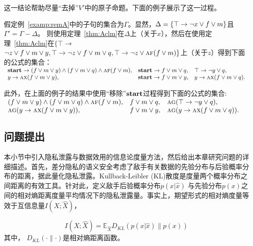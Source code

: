 这一结论帮助尽量“去掉”$V'$中的原子命题。下面的例子展示了这一过程。
\begin{example}
	假定例~\ref{examp:remA}中的子句的集合为$\Gamma$。显然，$\Delta = \{\top \rightarrow \neg x \vee f \vee m\}$且$\Gamma'=\Gamma-\Delta$。
	则使用定理~\ref{thm:Aclm}在$\Delta$上（关于$x$），然后在使用定理~\ref{thm:Aclm}在$\{\top$ $\rightarrow$ $\neg z \vee f \vee m \vee y, \top \rightarrow \neg z \vee f \vee m\vee q, \top \rightarrow \neg z \vee \textsc{a} \textsc{f} (f \vee m)\}$上（关于$z$）得到下面的公式的集合：\\
	$\begin{array}{lll}
		\textbf{start}\rightarrow (f \vee m \vee y) \wedge (f \vee m\vee q) \wedge \textsc{a} \textsc{f} (f \vee m), &
		\textbf{start} \rightarrow f\vee m \vee q, &
		\top \rightarrow \neg y \vee q, \\
		y \rightarrow \textsc{a} \textsc{x}(f \vee m \vee y), &
		\textbf{start} \rightarrow f \vee m \vee y, & 
		y \rightarrow \textsc{a}\textsc{x}(f \vee m\vee q). 
	\end{array}
	$
\end{example}

此外，在上面的例子的结果中使用“移除”$\textbf{start}$过程得到下面的公式的集合:\\
$\begin{array}{lll}
	(f \vee m \vee y) \wedge (f \vee m\vee q) \wedge \textsc{a} \textsc{f} (f \vee m), &
	f\vee m \vee q, &
	\textsc{a}\textsc{g}(\top \rightarrow \neg y \vee q), \\
	\textsc{a}\textsc{g}(y \rightarrow \textsc{a} \textsc{x}(f \vee m \vee y)), &
	f \vee m \vee y, & 
	\textsc{a}\textsc{g}(y \rightarrow \textsc{a}\textsc{x}(f \vee m\vee q)).
\end{array}
$

\subsection{问题提出}\label{chapter05-problem-statement}

本小节中引入隐私泄露与数据效用的信息论度量方法，然后给出本章研究问题的详细描述。首先，差分隐私的语义安全考虑了敌手有关数据的先验分布与后验概率分布的距离，据此量化隐私泄露。Kullback-Leibler (KL)散度是度量两个概率分布之间距离的有效工具\cite{cover2006elements}。针对此，定义敌手后验概率分布$p(x|\hat{x})$ 与先验分布$p(x)$之间的相对熵距离度量平均情况下的隐私泄露量。事实上，期望形式的相对熵度量等效于互信息量$I(X;\hat{X})$\cite{calmon2012privacy}，

\begin{equation}\label{chapter05-privacy-metrics}
	I(X;\hat{X})=\mathbb{E}_{\hat{X}}D_{KL}\left(p(x|\hat{x})\parallel p(x)\right)
\end{equation}
其中， $D_{KL}(\cdot \parallel \cdot)$是相对熵距离函数。

